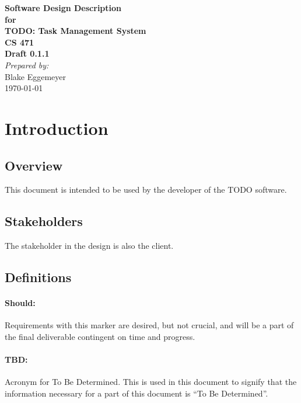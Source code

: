 \documentclass[12pt]{article}
\begin{document}
\begin{titlepage}
\begin{flushright} 
{\LARGE \bfseries Software Design Description}\\[1.2cm]
{\large \bfseries for}\\[1.2cm]
{\huge \bfseries TODO: Task Management System}\\[1.2cm]
{\large \bfseries CS 471}\\
\vfill
{\large \bfseries Draft 0.1.1}\\[2cm]
\emph{Prepared by:} \\
Blake Eggemeyer \\ [3cm]
{\large \today}
\end{flushright}
\end{titlepage}
\setcounter{tocdepth}{3}
\setcounter{secnumdepth}{5}
\tableofcontents
\newpage

\section{Introduction}

\subsection{Overview}
This document is intended to be used by the developer of the TODO software.

\subsection{Stakeholders}
The stakeholder in the design is also the client.

\subsection{Definitions}
\setcounter{paragraph}{0}
\setcounter{subsubsection}{0}
\paragraph{Should:} Requirements with this marker are desired, but not crucial, and will be a part of the final deliverable contingent on time and progress.
\paragraph{TBD:} Acronym for To Be Determined. This is used in this document to signify that the information necessary for a part of this document is ``To Be Determined''.
\end{document}
